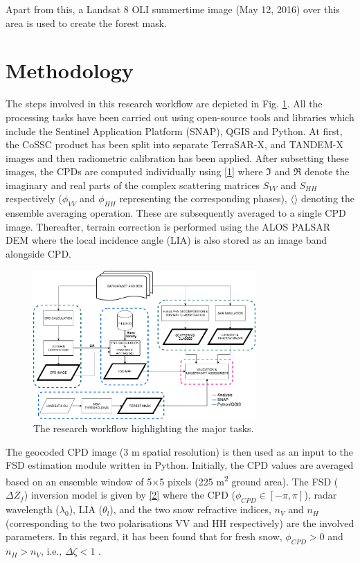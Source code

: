 \documentclass{article}
\begin{document}
Apart from this, a Landsat 8 OLI summertime image (May 12, 2016) over this area is used to create the forest mask.    
\section{Methodology}
\label{sec:method}
The steps involved in this research workflow are depicted in Fig. \ref{fig:work}. All the processing tasks have been carried out using open-source tools and libraries which include the Sentinel Application Platform (SNAP), QGIS and Python. At first, the CoSSC product has been split into separate TerraSAR-X, and TANDEM-X images and then radiometric calibration has been applied. After subsetting these images, the CPDs are computed individually using \eqref{1} where $\Im$ and $\Re$ denote the imaginary and real parts of the complex scattering matrices $S_{VV}$ and $S_{HH}$ respectively ($\phi_{VV}$ and $\phi_{HH}$ representing the corresponding phases), $\langle\rangle$ denoting the ensemble averaging operation. These are subsequently averaged to a single CPD image. Thereafter, terrain correction is performed using the ALOS PALSAR DEM where the local incidence angle (LIA) is also stored as an image band alongside CPD. 

\begin{figure}[htb]
\centering
\includegraphics[width=8.5cm]{Pictures/Method_FSD.png}
\vspace{-2ex}
\caption{The research workflow highlighting the major tasks.}
\label{fig:work}
\end{figure}

The geocoded CPD image (3 m spatial resolution) is then used as an input to the FSD estimation module written in Python. Initially, the CPD values are averaged based on an ensemble window of 5$\times$5 pixels (225 m\textsuperscript{2} ground area). The FSD ($\Delta Z_f$) inversion model is given by \eqref{2} where the CPD ($\phi_{CPD}\in[-\pi,\pi]$), radar wavelength ($\lambda_0$), LIA ($\theta_l$), and the two snow refractive indices, $n_V$ and $n_H$ (corresponding to the two polarisations VV and HH respectively) are the involved parameters. In this regard, it has been found that for fresh snow,  $\phi_{CPD}>0$ and $n_H>n_V$, i.e., $\Delta{\zeta}<1$ \cite{Leinss2014}.
\end{document}
